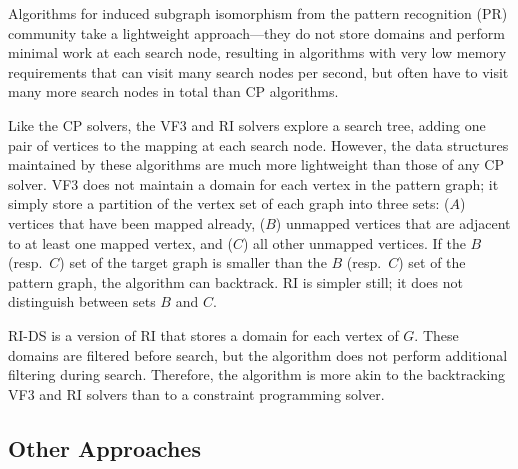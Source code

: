 Algorithms for induced subgraph isomorphism from the pattern recognition (PR) community
take a lightweight approach---they do not store domains and perform
minimal work at each search node, resulting in algorithms with very low memory
requirements that can visit many search nodes per second, but often have to
visit many more search nodes in total than CP algorithms.

Like the CP solvers, the VF3 \citep{DBLP:journals/pami/CarlettiFSV18} and RI
\citep{DBLP:journals/bmcbi/BonniciGPSF13,DBLP:journals/tcbb/BonniciG17}
solvers explore a search tree, adding one pair of vertices to the mapping at each
search node.  However, the data structures maintained by these algorithms are
much more lightweight than those of any CP solver.  VF3 does not maintain
a domain for each vertex in the pattern graph; it simply store a partition
of the vertex set of each graph into three sets: ($A$) vertices that have been
mapped already, ($B$) unmapped vertices that are adjacent to at least one mapped vertex, and
($C$) all other unmapped vertices.
If the $B$ (resp.\ $C$) set of the target graph is smaller than the $B$ (resp.\ $C$)
set of the pattern graph, the algorithm can backtrack.
RI is simpler still; it does not distinguish between sets $B$ and $C$.

RI-DS \citep{DBLP:journals/bmcbi/BonniciGPSF13} is a version of RI that
stores a domain for each vertex of $G$. These domains are filtered before search,
but the algorithm does not perform additional filtering during search.  Therefore,
the algorithm is more akin to the backtracking VF3 and RI solvers than to a
constraint programming solver.

\subsection{Other Approaches}\label{subsec:other-approaches-sip}

